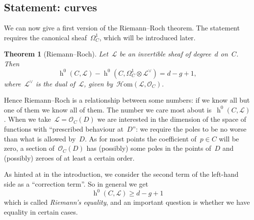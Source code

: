 \documentclass[10pt,a4paper]{article}
\theoremstyle{lecture}
\newtheorem{theorem}{Theorem}
\DeclareMathOperator\hh{h}
\begin{document}
\subsection{Statement: curves}
\label{subsection:statement-curves}
We can now give a first version of the Riemann--Roch theorem. The statement requires the canonical sheaf~$\Omega_C^1$, which will be introduced later\fixthis.
\begin{theorem}[Riemann--Roch]
  \label{theorem:riemann-roch}
  Let~$\mathcal{L}$ be an invertible sheaf of degree~$d$ on~$C$. Then
  \begin{equation}
    \hh^0(C,\mathcal{L})-\hh^0(C,\Omega_C^1\otimes\mathcal{L}^\vee)=d-g+1,
  \end{equation}
  where~$\mathcal{L}^\vee$ is the dual of~$\mathcal{L}$, given by~$\mathcal{H}\mathrm{om}(\mathcal{L},\mathcal{O}_C)$.
\end{theorem}
Hence Riemann--Roch is a relationship between some numbers: if we know all but one of them we know all of them. The number we care most about is~$\hh^0(C,\mathcal{L})$. When we take~$\mathcal{L}=\mathcal{O}_C(D)$ we are interested in the dimension of the space of functions with ``prescribed behaviour at~$D$'': we require the poles to be no worse than what is allowed by~$D$. As for most points the coefficient of~$p\in C$ will be zero, a section of~$\mathcal{O}_C(D)$ has (possibly) some poles in the points of~$D$ and (possibly) zeroes of at least a certain order.

As hinted at in the introduction, we consider the second term of the left-hand side as a ``correction term''. So in general we get
\begin{equation}
  \hh^0(C,\mathcal{L})\geq d-g+1
\end{equation}
which is called \emph{Riemann's equality}, and an important question is whether we have equality in certain cases.
\end{document}
